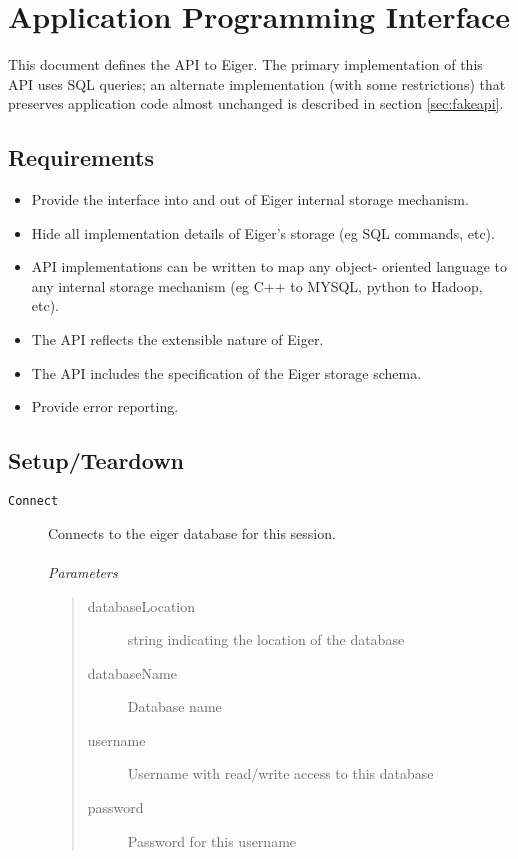 \section{Application Programming Interface}
\label{sec:api}
This document defines the API to Eiger. The primary implementation of this API uses SQL queries; an alternate implementation (with some restrictions) that preserves application code almost unchanged is described in section \ref{sec:fakeapi}.

\subsection{Requirements}

\begin{itemize}
\item Provide the interface into and out of Eiger internal 
  storage mechanism.

\item Hide all implementation details of Eiger's storage (eg
  SQL commands, etc).

\item API implementations can be written to map any object-
  oriented language to any internal storage mechanism (eg 
  C++ to MYSQL, python to Hadoop, etc).
 
\item The API reflects the extensible nature of Eiger.

\item The API includes the specification of the Eiger storage
  schema.

\item Provide error reporting.
\end{itemize}

\subsection{Setup/Teardown}
\begin{description}
\item[\texttt{Connect}]
	Connects to the eiger database for this session.\\ \\
	{\em Parameters}
	\begin{quote}
	\begin{description}
    \item[databaseLocation] string indicating the location of the database
    \item[databaseName] Database name
    \item[username] Username with read/write access to this database
    \item[password] Password for this username
	\end{description}
	\end{quote}
\end{description}

